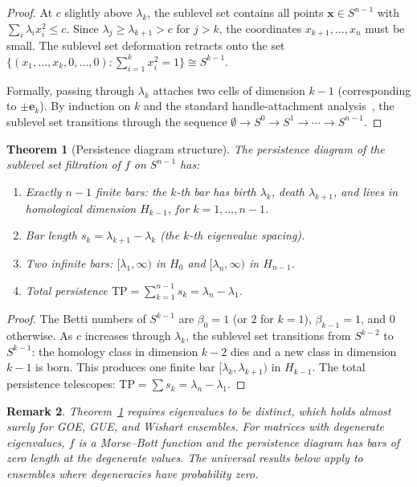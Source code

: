 \documentclass[aps,pre,twocolumn,superscriptaddress,showpacs]{revtex4-2}
\newtheorem{theorem}{Theorem}
\newtheorem{remark}[theorem]{Remark}
\begin{document}
\begin{proof}
At $c$ slightly above $\lambda_k$, the sublevel set contains all points $\mathbf{x} \in S^{n-1}$ with $\sum_i \lambda_i x_i^2 \le c$. Since $\lambda_j \ge \lambda_{k+1} > c$ for $j > k$, the coordinates $x_{k+1}, \ldots, x_n$ must be small. The sublevel set deformation retracts onto the set $\{(x_1, \ldots, x_k, 0, \ldots, 0) : \sum_{i=1}^k x_i^2 = 1\} \cong S^{k-1}$.

Formally, passing through $\lambda_k$ attaches two cells of dimension $k - 1$ (corresponding to $\pm \mathbf{e}_k$). By induction on $k$ and the standard handle-attachment analysis~\cite{milnor1963}, the sublevel set transitions through the sequence $\emptyset \to S^0 \to S^1 \to \cdots \to S^{n-1}$.
\end{proof}

\begin{theorem}[Persistence diagram structure]
\label{thm:pd}
The persistence diagram of the sublevel set filtration of $f$ on $S^{n-1}$ has:
\begin{enumerate}
\item Exactly $n - 1$ finite bars: the $k$-th bar has birth $\lambda_k$, death $\lambda_{k+1}$, and lives in homological dimension $H_{k-1}$, for $k = 1, \ldots, n-1$.
\item Bar length $s_k = \lambda_{k+1} - \lambda_k$ (the $k$-th eigenvalue spacing).
\item Two infinite bars: $[\lambda_1, \infty)$ in $H_0$ and $[\lambda_n, \infty)$ in $H_{n-1}$.
\item Total persistence $\mathrm{TP} = \sum_{k=1}^{n-1} s_k = \lambda_n - \lambda_1$.
\end{enumerate}
\end{theorem}

\begin{proof}
The Betti numbers of $S^{k-1}$ are $\beta_0 = 1$ (or $2$ for $k = 1$), $\beta_{k-1} = 1$, and $0$ otherwise. As $c$ increases through $\lambda_k$, the sublevel set transitions from $S^{k-2}$ to $S^{k-1}$: the homology class in dimension $k-2$ dies and a new class in dimension $k-1$ is born. This produces one finite bar $[\lambda_k, \lambda_{k+1})$ in $H_{k-1}$. The total persistence telescopes: $\mathrm{TP} = \sum s_k = \lambda_n - \lambda_1$.
\end{proof}

\begin{remark}
Theorem~\ref{thm:pd} requires eigenvalues to be distinct, which holds almost surely for GOE, GUE, and Wishart ensembles. For matrices with degenerate eigenvalues, $f$ is a Morse--Bott function and the persistence diagram has bars of zero length at the degenerate values. The universal results below apply to ensembles where degeneracies have probability zero.
\end{remark}
\end{document}
